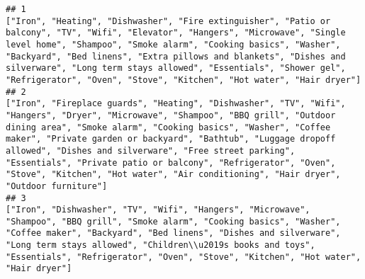 \documentclass[
]{article}
\begin{document}
\begin{verbatim}
## 1                                                                                                                                                                                                                                                                                                                                                                                                                                                                                                                                                                                                                      ["Iron", "Heating", "Dishwasher", "Fire extinguisher", "Patio or balcony", "TV", "Wifi", "Elevator", "Hangers", "Microwave", "Single level home", "Shampoo", "Smoke alarm", "Cooking basics", "Washer", "Backyard", "Bed linens", "Extra pillows and blankets", "Dishes and silverware", "Long term stays allowed", "Essentials", "Shower gel", "Refrigerator", "Oven", "Stove", "Kitchen", "Hot water", "Hair dryer"]
## 2                                                                                                                                                                                                                                                                                                                                                                                                                                                                                                                                                ["Iron", "Fireplace guards", "Heating", "Dishwasher", "TV", "Wifi", "Hangers", "Dryer", "Microwave", "Shampoo", "BBQ grill", "Outdoor dining area", "Smoke alarm", "Cooking basics", "Washer", "Coffee maker", "Private garden or backyard", "Bathtub", "Luggage dropoff allowed", "Dishes and silverware", "Free street parking", "Essentials", "Private patio or balcony", "Refrigerator", "Oven", "Stove", "Kitchen", "Hot water", "Air conditioning", "Hair dryer", "Outdoor furniture"]
## 3                                                                                                                                                                                                                                                                                                                                                                                                                                                                                                                                                                                                                                                                                       ["Iron", "Dishwasher", "TV", "Wifi", "Hangers", "Microwave", "Shampoo", "BBQ grill", "Smoke alarm", "Cooking basics", "Washer", "Coffee maker", "Backyard", "Bed linens", "Dishes and silverware", "Long term stays allowed", "Children\\u2019s books and toys", "Essentials", "Refrigerator", "Oven", "Stove", "Kitchen", "Hot water", "Hair dryer"]

\end{verbatim}
\end{document}
